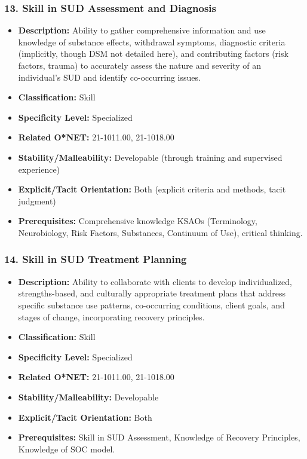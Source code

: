 \documentclass[
  letterpaper,
  DIV=11,
  numbers=noendperiod]{scrartcl}
\providecommand{\tightlist}{%
  \setlength{\itemsep}{0pt}\setlength{\parskip}{0pt}}
\begin{document}
\subsubsection{13. Skill in SUD Assessment and
Diagnosis}\label{skill-in-sud-assessment-and-diagnosis}

\begin{itemize}
\tightlist
\item
  \textbf{Description:} Ability to gather comprehensive information and
  use knowledge of substance effects, withdrawal symptoms, diagnostic
  criteria (implicitly, though DSM not detailed here), and contributing
  factors (risk factors, trauma) to accurately assess the nature and
  severity of an individual's SUD and identify co-occurring issues.
\item
  \textbf{Classification:} Skill
\item
  \textbf{Specificity Level:} Specialized
\item
  \textbf{Related O*NET:} 21-1011.00, 21-1018.00
\item
  \textbf{Stability/Malleability:} Developable (through training and
  supervised experience)
\item
  \textbf{Explicit/Tacit Orientation:} Both (explicit criteria and
  methods, tacit judgment)
\item
  \textbf{Prerequisites:} Comprehensive knowledge KSAOs (Terminology,
  Neurobiology, Risk Factors, Substances, Continuum of Use), critical
  thinking.
\end{itemize}

\subsubsection{14. Skill in SUD Treatment
Planning}\label{skill-in-sud-treatment-planning}

\begin{itemize}
\tightlist
\item
  \textbf{Description:} Ability to collaborate with clients to develop
  individualized, strengths-based, and culturally appropriate treatment
  plans that address specific substance use patterns, co-occurring
  conditions, client goals, and stages of change, incorporating recovery
  principles.
\item
  \textbf{Classification:} Skill
\item
  \textbf{Specificity Level:} Specialized
\item
  \textbf{Related O*NET:} 21-1011.00, 21-1018.00
\item
  \textbf{Stability/Malleability:} Developable
\item
  \textbf{Explicit/Tacit Orientation:} Both
\item
  \textbf{Prerequisites:} Skill in SUD Assessment, Knowledge of Recovery
  Principles, Knowledge of SOC model.
\end{itemize}
\end{document}
